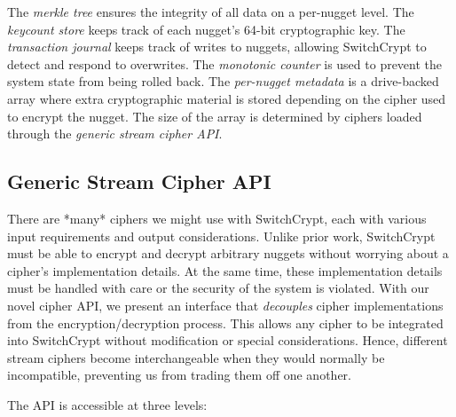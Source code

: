 The \emph{merkle tree} ensures the integrity of all data on a per-nugget level.
The \emph{keycount store} keeps track of each nugget's 64-bit cryptographic key.
The \emph{transaction journal} keeps track of writes to nuggets, allowing
SwitchCrypt to detect and respond to overwrites. The \emph{monotonic counter} is
used to prevent the system state from being rolled back. The \emph{per-nugget
metadata} is a drive-backed array where extra cryptographic material is stored
depending on the cipher used to encrypt the nugget. The size of the array is
determined by ciphers loaded through the \emph{generic stream cipher API}.

\subsection{Generic Stream Cipher API} \label{subsec:api}

There are *many* ciphers we might use with SwitchCrypt, each with various input
requirements and output considerations. Unlike prior work, SwitchCrypt must be
able to encrypt and decrypt arbitrary nuggets without worrying about a cipher's
implementation details. At the same time, these implementation details must be
handled with care or the security of the system is violated. With our novel
cipher API, we present an interface that \emph{decouples} cipher implementations
from the encryption/decryption process. This allows any cipher to be integrated
into SwitchCrypt without modification or special considerations. Hence,
different stream ciphers become interchangeable when they would normally be
incompatible, preventing us from trading them off one another.

The API is accessible at three levels:

